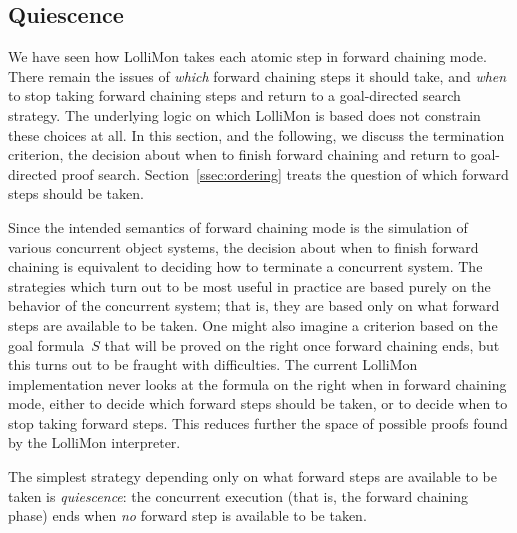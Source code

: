 \documentclass{sig-alt}
\begin{document}
\subsection{Quiescence}
\label{ssec:quiescence}
We have seen how LolliMon takes each atomic step in forward chaining
mode.  There remain the issues of \emph{which} forward chaining steps
it should take, and \emph{when} to stop taking forward chaining steps
and return to a goal-directed search strategy.
The underlying logic on which LolliMon is based does not constrain
these choices at all.
In this section, and the following, we discuss the termination criterion,
the decision about when to finish forward chaining and return to goal-directed
proof search.  Section~\ref{ssec:ordering} treats the question of which
forward steps should be taken.

Since the intended semantics of forward chaining mode is the simulation
of various concurrent object systems, the decision about when to finish
forward chaining is equivalent to deciding how to terminate a concurrent
system.  The strategies which turn out to be most useful in practice are
based purely on the behavior of the concurrent system; that is, they are
based only on what forward steps are available to be taken.
One might also
imagine a criterion based on the goal formula~$S$ that will be proved on
the right once forward chaining ends, but this turns out to be fraught
with difficulties.  The current LolliMon implementation never
looks at the formula on the right when in forward chaining mode, either
to decide which forward steps should be taken, or to decide when to
stop taking forward steps.  This reduces further the space of possible
proofs found by the LolliMon interpreter.

The simplest strategy 
depending only on what
forward steps are available to be taken
is \emph{quiescence}: the concurrent execution (that is, the forward
chaining phase) ends when \emph{no} forward step is available to be
taken.
\end{document}
